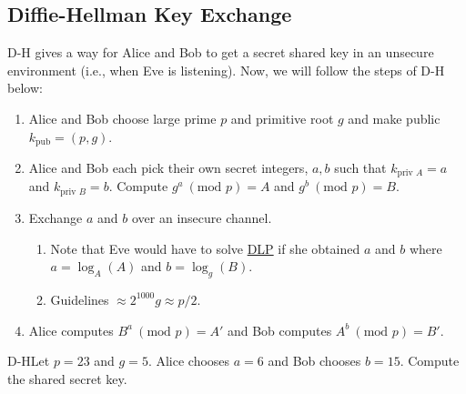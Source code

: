 \subsection{Diffie-Hellman Key Exchange}

D-H gives a way for Alice and Bob to get a secret shared key in an unsecure environment (i.e., when Eve is listening). Now, we will follow the steps of D-H below:

\begin{enumerate}[label=\arabic*.]
    \item Alice and Bob choose large prime \(p\) and primitive root \(g\) and make public \(k_{\text{pub}} = (p,g)\).
    \item Alice and Bob each pick their own secret integers, \(a,b\) such that \(k_{\text{priv } A} = a\) and \(k_{\text{priv } B} = b\). Compute \(g^a \ (\text{mod } p) = A\) and \(g^b \ (\text{mod } p) = B\).
    \item Exchange \(a\) and \(b\) over an insecure channel.
          \begin{enumerate}[label=\roman*.]
              \item Note that Eve would have to solve \hyperlink{Discrete Logarithm Problem}{DLP} if she obtained \(a\) and \(b\) where \(a = \log_A(A)\) and \(b = \log_g(B)\).
              \item Guidelines \(\approx 2^{1000} g \approx p/2\).
          \end{enumerate}
    \item Alice computes \(B^a \ (\text{mod } p) = A'\) and Bob computes \(A^b \ (\text{mod } p) = B'\).
\end{enumerate}

\begin{example}
    {D-H}Let \(p = 23\) and \(g = 5\). Alice chooses \(a = 6\) and Bob chooses \(b = 15\). Compute the shared secret key.
\end{example}



